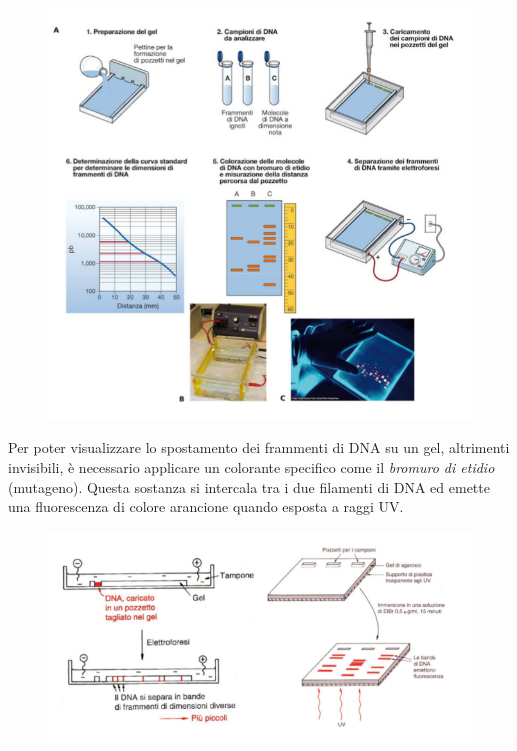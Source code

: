 \documentclass[]{article}
\begin{document}
\begin{figure}[htp]
\centering
\includegraphics[scale=1.00]{img/66_Elettroforesi.png}
\caption{}
\label{elettroforesi}
\end{figure}

Per poter visualizzare lo spostamento dei frammenti di DNA su un gel,
altrimenti invisibili, è necessario applicare un colorante specifico
come il \emph{bromuro di etidio} (mutageno). Questa sostanza si
intercala tra i due filamenti di DNA ed emette una fluorescenza di
colore arancione quando esposta a raggi UV.

\begin{figure}[htp]
\centering
\includegraphics[scale=1.00]{img/64_Elettroforesi su gel.png}
\caption{}
\label{elettroforesi-su-gel}
\end{figure}
\end{document}
